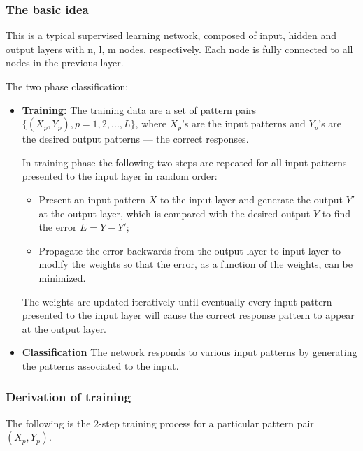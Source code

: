 
\subsubsection*{The basic idea}

This is a typical supervised learning network, composed of input, hidden and 
output layers with n, l, m nodes, respectively. Each node is fully connected 
to all nodes in the previous layer.

\vskip 2in

The two phase classification:
\begin{itemize}
\item {\bf Training:}  The training data are a set of pattern pairs 
	$\{(X_p, Y_p), p=1,2,...,L\}$, where $X_p$'s are the input patterns 
	and $Y_p$'s are the desired output patterns --- the correct responses.

	In training phase the following two steps are repeated for all input
	patterns presented to the input layer in random order:
\begin{itemize}
	\item Present an input pattern $X$ to the input layer and generate
		the output $Y'$ at the output layer, which is compared with
		the desired output $Y$ to find the error $E=Y-Y'$;
	\item Propagate the error backwards from the output layer to input
		layer to modify the weights so that the error, as a function
		of the weights, can be minimized.
\end{itemize}

The weights are updated iteratively until eventually every input pattern 
presented to the input layer will cause the correct response pattern to appear
at the output layer. 

\item {\bf Classification} The network responds to various input patterns
	by generating the patterns associated to the input.

\end{itemize}

\subsubsection*{Derivation of training}

The following is the 2-step training process for a particular pattern pair 
$(X_p, Y_p)$.
 
